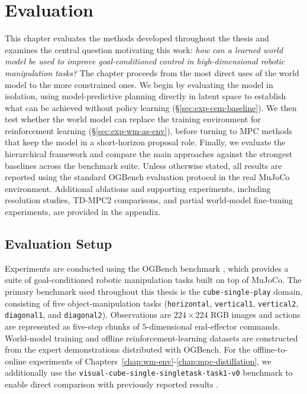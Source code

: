 \chapter{Evaluation}
\label{chap:experiments}

This chapter evaluates the methods developed throughout the thesis and
examines the central question motivating this work: \emph{how can a
learned world model be used to improve goal-conditioned control in
high-dimensional robotic manipulation tasks?}
The chapter proceeds from the most direct uses of the world model to the
more constrained ones. We begin by evaluating the model in isolation,
using model-predictive planning directly in latent space to establish
what can be achieved without policy learning
(\S\ref{sec:exp-cem-baseline}). We then test whether the world model can
replace the training environment for reinforcement learning
(\S\ref{sec:exp-wm-as-env}), before turning to MPC methods that keep the
model in a short-horizon proposal role. Finally, we evaluate the
hierarchical framework and compare the main approaches against the
strongest baselines across the benchmark suite.
Unless otherwise stated, all results are reported using the standard
OGBench evaluation protocol in the real MuJoCo environment. Additional
ablations and supporting experiments, including resolution studies,
TD-MPC2 comparisons, and partial world-model fine-tuning experiments,
are provided in the appendix.

\section{Evaluation Setup}
\label{sec:exp-setup}

Experiments are conducted using the OGBench benchmark
\cite{ogbench_park2025}, which provides a suite of goal-conditioned
robotic manipulation tasks built on top of MuJoCo. The primary benchmark
used throughout this thesis is the
\texttt{cube-single-play} domain, consisting of five object-manipulation
tasks (\texttt{horizontal}, \texttt{vertical1},
\texttt{vertical2}, \texttt{diagonal1}, and
\texttt{diagonal2}). Observations are $224\times224$ RGB images and
actions are represented as five-step chunks of $5$-dimensional
end-effector commands.
World-model training and offline reinforcement-learning datasets are
constructed from the expert demonstrations distributed with OGBench.
For the offline-to-online experiments of
Chapters~\ref{chap:wm-env}-\ref{chap:mpc-distillation}, we additionally use the
\texttt{visual-cube-single-singletask-task1-v0} benchmark to enable
direct comparison with previously reported results
\cite{li2026reinforcementlearningactionchunking}.

